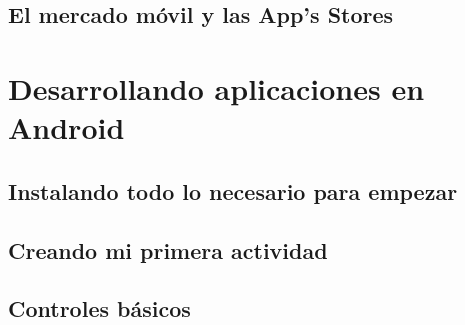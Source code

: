 \documentclass[letterpaper,12pt,dvips]{book}
\newcommand{\fnz}{\footnotesize}
\newcounter{ejemplo}
\begin{document}
\begin{mainmatter}


\setcounter{ejemplo}{0}
 \chapter{El mercado móvil y las App's Stores}



\part{Desarrollando aplicaciones en Android}
\chapter{Instalando todo lo necesario para empezar}\label{cap:actividad}


\chapter{Creando mi primera actividad}



\chapter{Controles básicos}



\end{mainmatter}
\end{document}

